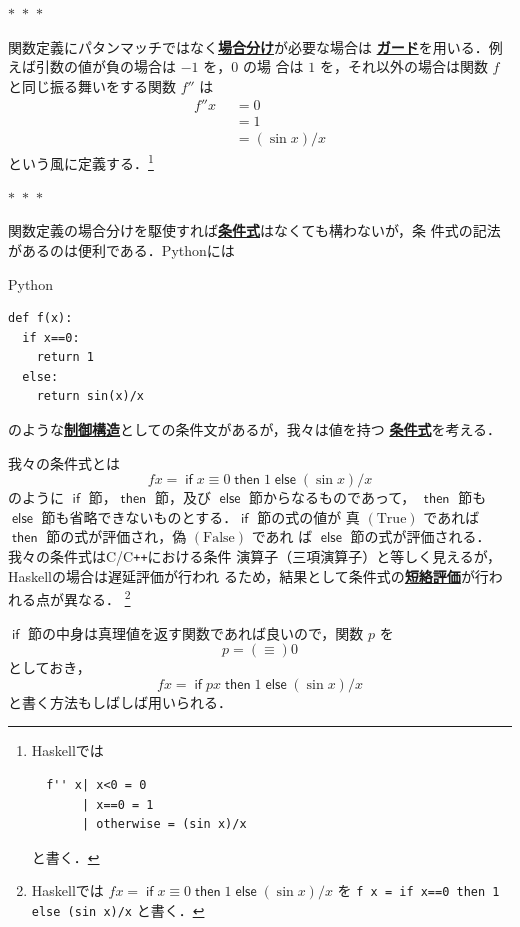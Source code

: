 \documentclass[a5paper,twoside,fleqn,draft]{jsbook}
\newcommand{\separator}{\begin{center}$*$~$*$~$*$\end{center}}
\newcommand{\programminglanguage}[1]{\textsf{#1}}
\newcommand{\clang}{\programminglanguage{C}}
\newcommand{\cxx}{\programminglanguage{C}\texttt{++}}
\newcommand{\haskell}{\programminglanguage{Haskell}}
\newcommand{\python}{\programminglanguage{Python}}
\newcommand{\keyword}[1]{{\underline{\textbf{#1}}}}
\newcommand{\code}[1]{\texttt{#1}}
\newenvironment{pythoncode}{\begin{itembox}[r]{\python}}{\end{itembox}}
\newcommand{\mKeyword}[1]{\mathsf{#1}}
\newcommand{\mIfKeyword}{\mKeyword{if}}
\newcommand{\mElseKeyword}{\mKeyword{else}}
\newcommand{\mOtherwiseKeyword}{\mKeyword{otherwise}}
\newcommand{\mThenKeyword}{\mKeyword{then}}
\DeclareMathOperator{\mElse}{\mElseKeyword}
\DeclareMathOperator{\mIf}{\mIfKeyword}
\DeclareMathOperator{\mOtherwise}{\mOtherwiseKeyword}
\DeclareMathOperator{\mThen}{\mThenKeyword}
\newcommand{\mSpecialConstant}[1]{\textrm{#1}}
\newcommand{\mFalse}{\mSpecialConstant{False}}
\newcommand{\mTrue}{\mSpecialConstant{True}}
\newcommand{\mGuard}[1]{\mathop{\mid_{#1}}}
\newcommand{\mIfThenElseEXP}[3]{\mIf{#1}\mThen{#2}\mElse{#3}} %
\begin{document}
\separator

関数定義にパタンマッチではなく\keyword{場合分け}が必要な場合は
\keyword{ガード}を用いる．例えば引数の値が負の場合は $-1$ を，$0$ の場
合は $1$ を，それ以外の場合は関数 $f$ と同じ振る舞いをする関数 $f''$ は
\begin{equation}
  \begin{aligned}
    f''x&\mGuard{x<0}=0\\
    &\mGuard{x\equiv0}=1\\
    &\mGuard{\mOtherwise}=(\sin x)/x
  \end{aligned}
\end{equation}
という風に定義する．\footnote{\haskell では
\begin{verbatim}
  f'' x| x<0 = 0
       | x==0 = 1
       | otherwise = (sin x)/x
\end{verbatim}
と書く．}

\separator

関数定義の場合分けを駆使すれば\keyword{条件式}はなくても構わないが，条
件式の記法があるのは便利である．\python には
\begin{pythoncode}
\begin{verbatim}
def f(x):
  if x==0:
    return 1
  else:
    return sin(x)/x
\end{verbatim}
\end{pythoncode}
のような\keyword{制御構造}としての条件文があるが，我々は値を持つ
\keyword{条件式}を考える．

我々の条件式とは
\begin{equation}
  fx
  =\mIf x\equiv0
  \mThen1
  \mElse{}(\sin x)/x
\end{equation}
のように $\mIf$ 節，$\mThen$ 節，及び $\mElse$ 節からなるものであって，
$\mThen$ 節も $\mElse$ 節も省略できないものとする．$\mIf$ 節の式の値が
真 $(\mTrue)$ であれば $\mThen$ 節の式が評価され，偽 $(\mFalse)$ であれ
ば $\mElse$ 節の式が評価される．我々の条件式は\clang/\cxx における条件
演算子（三項演算子）と等しく見えるが，\haskell の場合は遅延評価が行われ
るため，結果として条件式の\keyword{短絡評価}が行われる点が異なる．
\footnote{\haskell では $fx=\mIfThenElseEXP{x\equiv0}{1}{{}(\sin x)/x}$
を \code{f x = if x==0 then 1 else (sin x)/x} と書く．}

$\mIf$ 節の中身は真理値を返す関数であれば良いので，関数 $p$ を
\begin{equation}
  p
  =(\equiv)0
\end{equation}
としておき，
\begin{equation}
  fx
  =\mIf px
  \mThen1
  \mElse{}(\sin x)/x
\end{equation}
と書く方法もしばしば用いられる．
\end{document}
